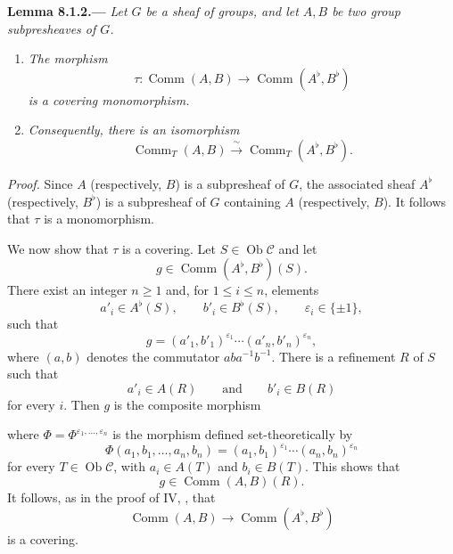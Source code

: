 
\medskip
{}\label{lem:sga3-VIB-8.1.2}%
\noindent\textbf{Lemma 8.1.2.---}
\emph{Let \(G\) be a sheaf of groups, and let \(A,B\) be two
group subpresheaves of \(G\).}
\begin{enumerate}
\item[\textup{\SGAInlineRefTarget{lem:sga3-VIB-8.1.2:item:i}(i)}]\label{concl:sga3-VIB-8.1.2-i}
  \emph{The morphism}
  \[
    \tau:\operatorname{Comm}(A,B)
      \longrightarrow
      \operatorname{Comm}(A^\flat,B^\flat)
  \]
  \emph{is a covering monomorphism.}

\item[\textup{(ii)}]\label{concl:sga3-VIB-8.1.2-ii}
  \emph{Consequently, there is an isomorphism}
  \label{form:sga3-VIB-8.1.2-CommT-isomorphism}%
  \[
    \operatorname{Comm}_T(A,B)
      \xrightarrow{\ \sim\ }
    \operatorname{Comm}_T(A^\flat,B^\flat).
  \]
\end{enumerate}

\emph{Proof.}
\textup{} Since \(A\) (respectively, \(B\)) is a
subpresheaf of \(G\), the associated sheaf \(A^\flat\)
(respectively, \(B^\flat\)) is a subpresheaf of \(G\)
containing \(A\) (respectively, \(B\)). It follows that
\(\tau\) is a monomorphism.

We now show that \(\tau\) is a covering. Let
\(S\in\operatorname{Ob}\mathcal C\) and let
\[
  g\in\operatorname{Comm}(A^\flat,B^\flat)(S).
\]
There exist an integer \(n\geq1\) and, for \(1\leq i\leq n\),
elements
\[
  a'_i\in A^\flat(S),\qquad
  b'_i\in B^\flat(S),\qquad
  \varepsilon_i\in\{\pm1\},
\]
such that
\[
  g=(a'_1,b'_1)^{\varepsilon_1}\cdots
    (a'_n,b'_n)^{\varepsilon_n},
\]
where \((a,b)\) denotes the commutator \(aba^{-1}b^{-1}\).
There is a refinement \(R\) of \(S\) such that
\[
  a'_i\in A(R)
  \qquad\text{and}\qquad
  b'_i\in B(R)
\]
for every \(i\). Then \(g\) is the composite morphism
\begin{center}
  \label{diag:sga3-VIB-8.1.2-composite}%
\end{center}
where
\(\Phi=\Phi^{\varepsilon_1,\ldots,\varepsilon_n}\) is the
morphism defined set-theoretically by
\label{form:sga3-VIB-8.1.2-Phi}%
\[
  \Phi(a_1,b_1,\ldots,a_n,b_n)
    =(a_1,b_1)^{\varepsilon_1}\cdots
     (a_n,b_n)^{\varepsilon_n}
\]
for every \(T\in\operatorname{Ob}\mathcal C\), with
\(a_i\in A(T)\) and \(b_i\in B(T)\). This shows that
\[
  g\in\operatorname{Comm}(A,B)(R).
\]
It follows, as in the proof of IV, \textup{}, that
\[
  \operatorname{Comm}(A,B)
    \longrightarrow
  \operatorname{Comm}(A^\flat,B^\flat)
\]
is a covering.

